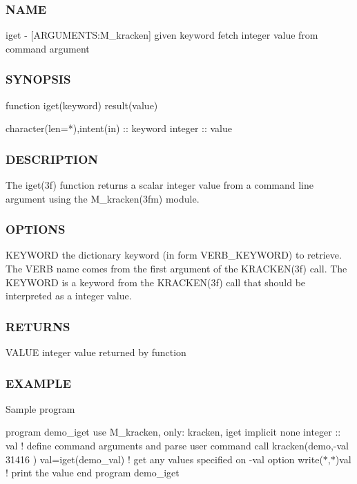 \subsubsection*{N\+A\+ME}

iget -\/ \mbox{[}A\+R\+G\+U\+M\+E\+N\+TS\+:M\+\_\+kracken\mbox{]} given keyword fetch integer value from command argument 

\subsubsection*{S\+Y\+N\+O\+P\+S\+IS}

\begin{DoxyVerb}function iget(keyword) result(value)

 character(len=*),intent(in)  :: keyword
 integer              :: value
\end{DoxyVerb}


\subsubsection*{D\+E\+S\+C\+R\+I\+P\+T\+I\+ON}

The iget(3f) function returns a scalar integer value from a command line argument using the M\+\_\+kracken(3fm) module.

\subsubsection*{O\+P\+T\+I\+O\+NS}

K\+E\+Y\+W\+O\+RD the dictionary keyword (in form V\+E\+R\+B\+\_\+\+K\+E\+Y\+W\+O\+RD) to retrieve. The V\+E\+RB name comes from the first argument of the K\+R\+A\+C\+K\+E\+N(3f) call. The K\+E\+Y\+W\+O\+RD is a keyword from the K\+R\+A\+C\+K\+E\+N(3f) call that should be interpreted as a integer value.

\subsubsection*{R\+E\+T\+U\+R\+NS}

V\+A\+L\+UE integer value returned by function

\subsubsection*{E\+X\+A\+M\+P\+LE}

Sample program

program demo\+\_\+iget use M\+\_\+kracken, only\+: kracken, iget implicit none integer \+:\+: val ! define command arguments and parse user command call kracken(\textquotesingle{}demo\textquotesingle{},\textquotesingle{}-\/val 31416\textquotesingle{} ) val=iget(\textquotesingle{}demo\+\_\+val\textquotesingle{}) ! get any values specified on -\/val option write($\ast$,$\ast$)val ! print the value end program demo\+\_\+iget


